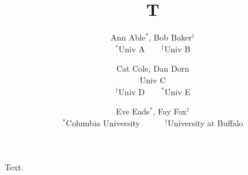 \documentclass{article}
\title{T}
\author{Ann Able$^{*}$, Bob Baker$^{\dagger}$ \\ $^{*}$Univ A~~~~$^{\dagger}$Univ B
\and Cat Cole, Dan Dorn \\ Univ C \\ $^{\dagger}$Univ D~~~~$^{*}$Univ E
\and Eve Eads$^{*}$, Fay Fox$^{\dagger}$ \\ $^{*}$Columbia University\ \ \ \ \ \ $^{\dagger}$University at Buffalo}
\begin{document}
\maketitle
Text.
\end{document}
